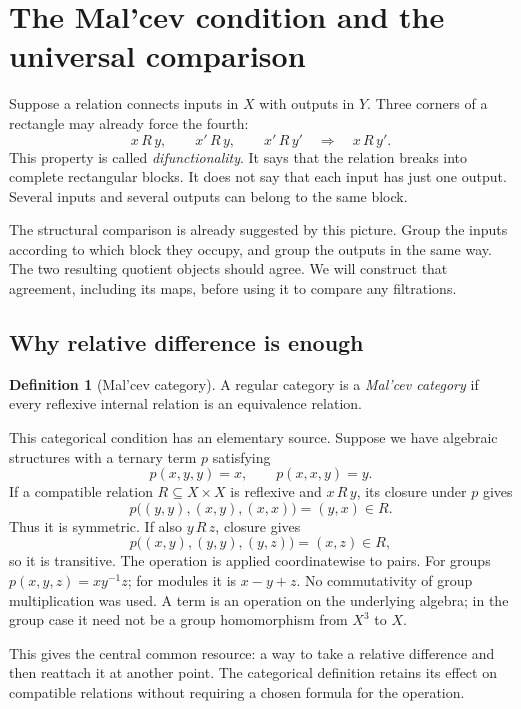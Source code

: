 \documentclass[11pt]{article}
\theoremstyle{definition}
\newtheorem{definition}[theorem]{Definition}
\theoremstyle{remark}\newtheorem{remark}[theorem]{Remark}
\begin{document}


\section{The Mal'cev condition and the universal comparison}
\label{d:begin}

Suppose a relation connects inputs in $X$ with outputs in $Y$. Three
corners of a rectangle may already force the fourth:
\[
x\,R\,y,\qquad x'\,R\,y,\qquad x'\,R\,y'
\quad\Longrightarrow\quad x\,R\,y'.
\]
This property is called \emph{difunctionality}. It says that the
relation breaks into complete rectangular blocks. It does not say that
each input has just one output. Several inputs and several outputs can
belong to the same block.

The structural comparison is already suggested by this picture. Group
the inputs according to which block they occupy, and group the outputs
in the same way. The two resulting quotient objects should agree. We
will construct that agreement, including its maps, before using it to
compare any filtrations.

\subsection{Why relative difference is enough}

\begin{definition}[Mal'cev category]\label{d:malcev}
A regular category is a \emph{Mal'cev category} if every reflexive
internal relation is an equivalence relation.
\end{definition}

This categorical condition has an elementary source. Suppose we have
algebraic structures with a ternary term $p$ satisfying
\[
p(x,y,y)=x,\qquad p(x,x,y)=y.
\]
If a compatible relation $R\subseteq X\times X$ is reflexive and
$x\,R\,y$, its closure under $p$ gives
\[
p\bigl((y,y),(x,y),(x,x)\bigr)=(y,x)\in R.
\]
Thus it is symmetric. If also $y\,R\,z$, closure gives
\[
p\bigl((x,y),(y,y),(y,z)\bigr)=(x,z)\in R,
\]
so it is transitive. The operation is applied coordinatewise to pairs.
For groups $p(x,y,z)=xy^{-1}z$; for modules it is $x-y+z$. No
commutativity of group multiplication was used. A term is an operation
on the underlying algebra; in the group case it need not be a group
homomorphism from $X^3$ to $X$.

This gives the central common resource: a way to take a relative
difference and then reattach it at another point. The categorical
definition retains its effect on compatible relations without requiring
a chosen formula for the operation.
\end{document}
